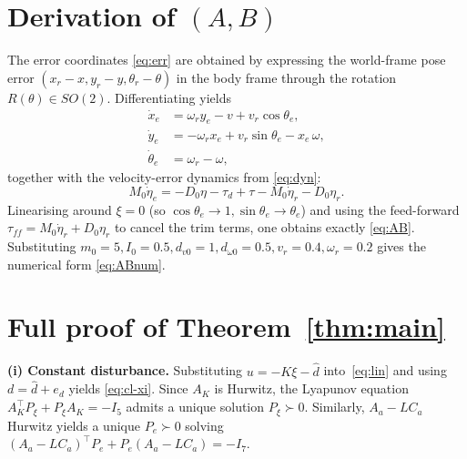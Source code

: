 \documentclass[conference]{IEEEtran}
\begin{document}
\appendices

\section{Derivation of \texorpdfstring{$(A,B)$}{(A,B)}}\label{app:matrices}

The error coordinates \eqref{eq:err} are obtained by expressing the
world-frame pose error $(x_r-x,y_r-y,\theta_r-\theta)$ in the body frame
through the rotation $R(\theta)\in SO(2)$. Differentiating yields
\begin{equation*}
\begin{aligned}
\dot x_e &= \omega_r y_e - v + v_r\cos\theta_e,\\
\dot y_e &= -\omega_r x_e + v_r\sin\theta_e - x_e\,\omega,\\
\dot\theta_e &= \omega_r-\omega,
\end{aligned}
\end{equation*}
together with the velocity-error dynamics from \eqref{eq:dyn}:
\begin{equation*}
M_0\dot\eta_e=-D_0\eta-\tau_d+\tau-M_0\dot\eta_r-D_0\eta_r.
\end{equation*}
Linearising around $\xi=0$ (so $\cos\theta_e\to 1,\sin\theta_e\to\theta_e$)
and using the feed-forward $\tau_{ff}=M_0\dot\eta_r+D_0\eta_r$ to cancel
the trim terms, one obtains exactly \eqref{eq:AB}. Substituting
$m_0=5,I_0=0.5,d_{v0}=1,d_{\omega 0}=0.5,v_r=0.4,\omega_r=0.2$ gives the
numerical form \eqref{eq:ABnum}.

\section{Full proof of Theorem~\ref{thm:main}}\label{app:proof}

\textbf{(i) Constant disturbance.}
Substituting $u=-K\xi-\hat d$ into~\eqref{eq:lin} and using
$d=\hat d+e_d$ yields \eqref{eq:cl-xi}.
Since $A_K$ is Hurwitz, the Lyapunov equation
$A_K^\top P_\xi+P_\xi A_K=-I_5$ admits a unique solution $P_\xi\succ 0$.
Similarly, $A_a-LC_a$ Hurwitz yields a unique $P_e\succ 0$ solving
$(A_a-LC_a)^\top P_e+P_e(A_a-LC_a)=-I_7$.
\end{document}
